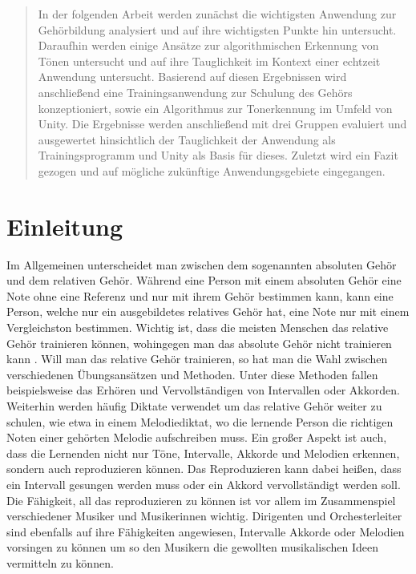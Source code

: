 \begin{abstract}
    In der folgenden Arbeit werden zunächst die wichtigsten Anwendung zur Gehörbildung analysiert und auf ihre wichtigsten Punkte hin untersucht. Daraufhin werden einige Ansätze zur algorithmischen Erkennung von Tönen untersucht und auf ihre Tauglichkeit im Kontext einer echtzeit Anwendung untersucht. Basierend auf diesen Ergebnissen wird anschließend eine Trainingsanwendung zur Schulung des Gehörs konzeptioniert, sowie ein Algorithmus zur Tonerkennung im Umfeld von Unity. Die Ergebnisse werden anschließend mit drei Gruppen evaluiert und ausgewertet hinsichtlich der Tauglichkeit der Anwendung als Trainingsprogramm und Unity als Basis für dieses. Zuletzt wird ein Fazit gezogen und auf mögliche zukünftige Anwendungsgebiete eingegangen.
\end{abstract}



\chapter{Einleitung}
Im Allgemeinen unterscheidet man zwischen dem sogenannten absoluten Gehör und dem relativen Gehör. Während eine Person mit einem absoluten Gehör eine Note ohne eine Referenz und nur mit ihrem Gehör bestimmen kann, kann eine Person, welche nur ein ausgebildetes relatives Gehör hat, eine Note nur mit einem Vergleichston bestimmen. Wichtig ist, dass die meisten Menschen das relative Gehör trainieren können, wohingegen man das absolute Gehör nicht trainieren kann \cite{gussmack2006latentes}. Will man das relative Gehör trainieren, so hat man die Wahl zwischen verschiedenen Übungsansätzen und Methoden. Unter diese Methoden fallen beispielsweise das Erhören und Vervollständigen von Intervallen oder Akkorden. Weiterhin werden häufig Diktate verwendet um das relative Gehör weiter zu schulen, wie etwa in einem Melodiediktat, wo die lernende Person die richtigen Noten einer gehörten Melodie aufschreiben muss. Ein großer Aspekt ist auch, dass die Lernenden nicht nur Töne, Intervalle, Akkorde und Melodien erkennen, sondern auch reproduzieren können. Das Reproduzieren kann dabei heißen, dass ein Intervall gesungen werden muss oder ein Akkord vervollständigt werden soll. Die Fähigkeit, all das reproduzieren zu können ist vor allem im Zusammenspiel verschiedener Musiker und Musikerinnen wichtig. Dirigenten und Orchesterleiter sind ebenfalls auf ihre Fähigkeiten angewiesen, Intervalle Akkorde oder Melodien vorsingen zu können um so den Musikern die gewollten musikalischen Ideen vermitteln zu können. 

